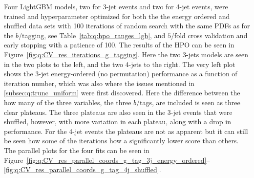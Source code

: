 Four LightGBM models, two for 3-jet events and two for 4-jet events, were trained and hyperparameter optimized for both the the energy ordered and shuffled data sets with \num{100} iterations of random search with the same PDFs as for the $b$\=/tagging, see Table~\ref{tab:q:hpo_ranges_lgb}, and $5$\=/fold cross validation and early stopping with a patience of \num{100}. The results of the HPO can be seen in Figure~\ref{fig:q:CV_res_iterations_g_tagging}. Here the two 3-jets models are seen in the two plots to the left, and the two 4-jets to the right. The very left plot shows the 3-jet energy-ordered (no permutation) performance as a function of iteration number, which was also where the issues mentioned in \autoref{subsec:q:trunc_uniform} were first discovered. Here the difference between the how many of the three variables, the three $b$\=/tags, are included is seen as three clear plateaus. The three plateaus are also seen in the 3-jet events that were shuffled, however, with more variation in each plateau, along with a drop in performance. For the 4-jet events the plateaus are not as apparent but it can still be seen how some of the iterations how a significantly lower score than others. The parallel plots for the four fits can be seen in Figure~\ref{fig:q:CV_res_parallel_coords_g_tag_3j_energy_ordered}--\ref{fig:q:CV_res_parallel_coords_g_tag_4j_shuffled}.


